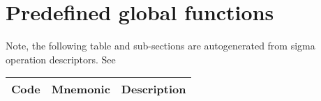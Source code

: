 \section{Predefined global functions}
\label{sec:appendix:primops}

Note, the following table and sub-sections are autogenerated from sigma operation descriptors. See 

    \scriptsize
    \begin{longtable}[h]{|l |l | p{.7\linewidth} |}
	\hline
Code &   Mnemonic   & Description \\
    \hline
     

    \end{longtable}
    \normalsize




 
